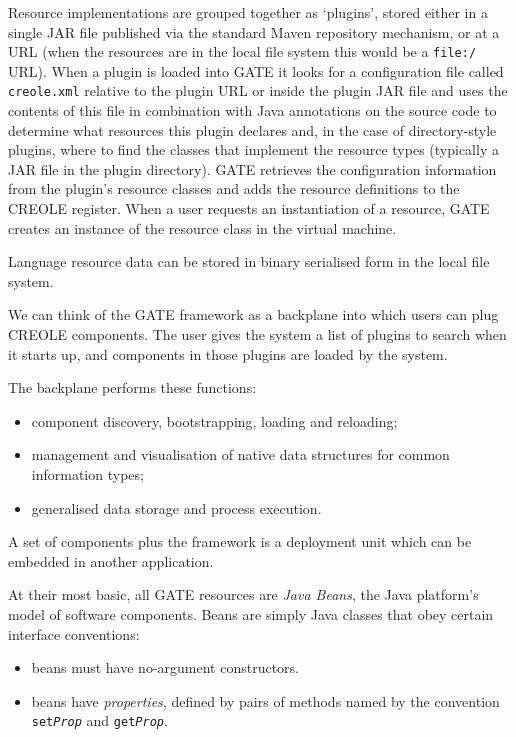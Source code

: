 Resource implementations are grouped together as `plugins', stored
either in a single JAR file published via the standard Maven repository
mechanism, or at a URL (when the resources are in the local file system this
would be a {\tt file:/} URL). When a plugin is loaded into GATE it looks
for a configuration file called {\tt creole.xml} relative to the plugin URL or
inside the plugin JAR file and uses the contents of this file in combination
with Java annotations on the source code to determine what resources this
plugin declares and, in the case of directory-style plugins, where to find the
classes that implement the resource types (typically a JAR file in the plugin
directory).  GATE retrieves the configuration information from the plugin's
resource classes and adds the resource definitions to the CREOLE register. When
a user requests an instantiation of a resource, GATE creates an instance of the
resource class in the virtual machine.

Language resource data can be stored in binary serialised form in the local
file system.


\label{sec:creole-model:beans}

We can think of the GATE framework as a backplane into
which users can plug CREOLE components.
The user gives the system a list of plugins to search when it starts up,
and components in those plugins are loaded by the system.

The backplane performs these functions:
\begin{itemize}
\item
component discovery, bootstrapping, loading and reloading;
\item
management and visualisation of
native data structures for common information types;
\item
generalised data storage and process execution.
\end{itemize}

A set of components plus the framework is a deployment unit which can be
embedded in another application.

At their most basic, all GATE resources are {\em Java Beans}, the Java
platform's model of software components. Beans are simply Java classes that
obey certain interface conventions:
\begin{itemize}
\item
beans must have no-argument constructors.
%
\item
beans have \emph{properties}, defined by pairs of methods named by the
convention \texttt{set\emph{Prop}} and \texttt{get\emph{Prop}}.
\end{itemize}
%

